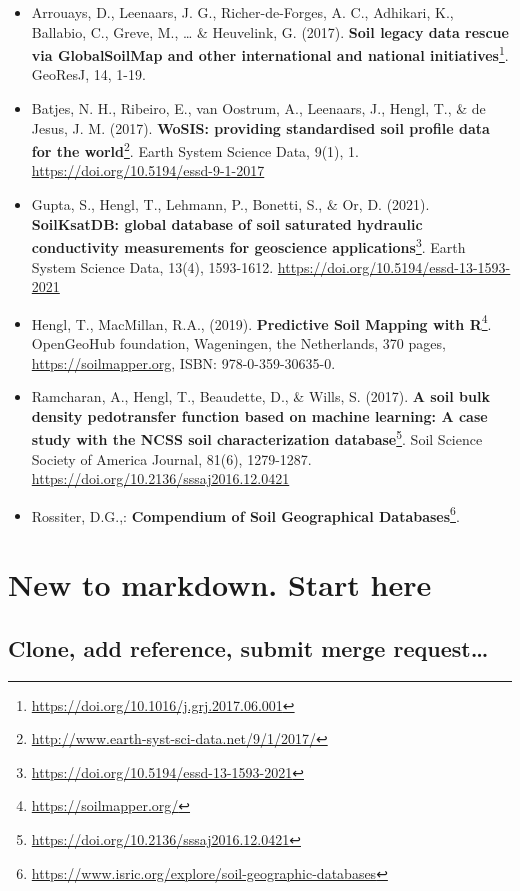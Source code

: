 \documentclass[
  graybox,natbib,nospthms]{svmono}
\providecommand{\tightlist}{%
  \setlength{\itemsep}{0pt}\setlength{\parskip}{0pt}}
\providecommand{\tightlist}{\setlength{\itemsep}{0pt}\setlength{\parskip}{0pt}}
\renewcommand{\href}[2]{#2 (\url{#1})}
\renewcommand{\href}[2]{#2\footnote{\url{#1}}}
\begin{document}
\begin{itemize}
\tightlist
\item
  Arrouays, D., Leenaars, J. G., Richer-de-Forges, A. C., Adhikari,
  K., Ballabio, C., Greve, M., \ldots{} \& Heuvelink, G. (2017). \href{https://doi.org/10.1016/j.grj.2017.06.001}{\textbf{Soil
  legacy data rescue via GlobalSoilMap and other international and
  national initiatives}}.
  GeoResJ, 14, 1-19.\\
\item
  Batjes, N. H., Ribeiro, E., van Oostrum, A., Leenaars, J., Hengl,
  T., \& de Jesus, J. M. (2017). \href{http://www.earth-syst-sci-data.net/9/1/2017/}{\textbf{WoSIS: providing standardised soil
  profile data for the world}}. Earth System Science Data, 9(1), 1. \url{https://doi.org/10.5194/essd-9-1-2017}~
\item
  Gupta, S., Hengl, T., Lehmann, P., Bonetti, S., \& Or, D. (2021). \href{https://doi.org/10.5194/essd-13-1593-2021}{\textbf{SoilKsatDB:
  global database of soil saturated hydraulic conductivity measurements for
  geoscience applications}}. Earth System Science Data, 13(4), 1593-1612.
  \url{https://doi.org/10.5194/essd-13-1593-2021}\\
\item
  Hengl, T., MacMillan, R.A., (2019). \href{https://soilmapper.org/}{\textbf{Predictive Soil Mapping with
  R}}. OpenGeoHub foundation, Wageningen, the
  Netherlands, 370 pages, \url{https://soilmapper.org}, ISBN:
  978-0-359-30635-0.\\
\item
  Ramcharan, A., Hengl, T., Beaudette, D., \& Wills, S. (2017). \href{https://doi.org/10.2136/sssaj2016.12.0421}{\textbf{A soil
  bulk density pedotransfer function based on machine learning: A case
  study with the NCSS soil characterization
  database}}. Soil Science
  Society of America Journal, 81(6), 1279-1287.
  \url{https://doi.org/10.2136/sssaj2016.12.0421}
\item
  Rossiter, D.G.,: \href{https://www.isric.org/explore/soil-geographic-databases}{\textbf{Compendium of Soil Geographical
  Databases}}.
\end{itemize}

\hypertarget{new-to-markdown.-start-here}{%
\chapter{New to markdown. Start here}\label{new-to-markdown.-start-here}}

\hypertarget{clone-add-reference-submit-merge-request}{%
\section{Clone, add reference, submit merge request\ldots{}}\label{clone-add-reference-submit-merge-request}}
\end{document}
